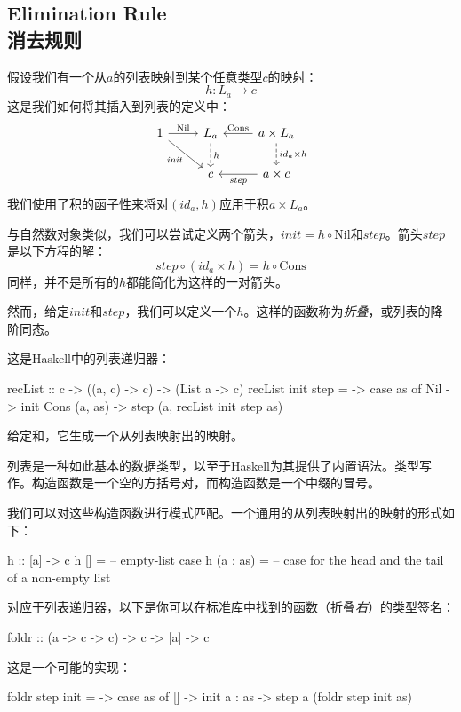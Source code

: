 \documentclass[DaoFP]{subfiles}
\begin{document}
    \subsection{Elimination Rule\\消去规则}

    假设我们有一个从$a$的列表映射到某个任意类型$c$的映射：
    \[h \colon L_a \to c\]
    这是我们如何将其插入到列表的定义中：
    \[
        \begin{tikzcd}
            1
            \arrow[r, "\text{Nil}"]
            \arrow[rd, "\mathit{init}"']
            &L_a
            \arrow[d, dashed, "h"]
            &a \times L_a
            \arrow[l, "\text{Cons}"']
            \arrow[d, dashed, "id_a \times h"]
            \\
            & c
            & a \times c
            \arrow[l, "\mathit{step}"]
        \end{tikzcd}
    \]
    我们使用了积的函子性来将对$(id_a, h)$应用于积$a \times L_a$。

    与自然数对象类似，我们可以尝试定义两个箭头，$\mathit{init} = h \circ \text{Nil}$和$\mathit{step}$。箭头$\mathit{step}$是以下方程的解：
    \[ \mathit{step} \circ (id_a \times h) = h \circ \text{Cons} \]
    同样，并不是所有的$h$都能简化为这样的一对箭头。

    然而，给定$\mathit{init}$和$\mathit{step}$，我们可以定义一个$h$。这样的函数称为\emph{折叠}，或列表的降阶同态。

    这是Haskell中的列表递归器：
    \begin{haskell}
        recList :: c -> ((a, c) -> c) -> (List a -> c)
        recList init step = \as ->
        case as of
        Nil          -> init
        Cons (a, as) -> step (a, recList init step as)
    \end{haskell}
    给定和，它生成一个从列表映射出的映射。

    列表是一种如此基本的数据类型，以至于Haskell为其提供了内置语法。类型写作\hask{[a]}。构造函数是一个空的方括号对\hask{[]}，而构造函数是一个中缀的冒号\hask{(:)}。

    我们可以对这些构造函数进行模式匹配。一个通用的从列表映射出的映射的形式如下：
    \begin{haskell}
        h :: [a] -> c
        h []      = -- empty-list case
        h (a : as) = -- case for the head and the tail of a non-empty list
    \end{haskell}

    对应于列表递归器，以下是你可以在标准库中找到的函数（折叠\emph{右}）的类型签名：
    \begin{haskell}
        foldr :: (a -> c -> c) -> c -> [a] -> c
    \end{haskell}
    这是一个可能的实现：
    \begin{haskell}
        foldr step init = \as ->
        case as of
        [] -> init
        a : as -> step a (foldr step init as)
    \end{haskell}
\end{document}
